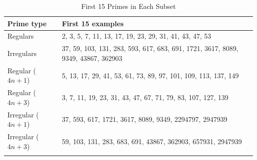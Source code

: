 \begin{longtable}{|l|p{8cm}|}
\hline
\textbf{Prime type} & \textbf{First 15 examples} \\ \hline
Regulars & 2, 3, 5, 7, 11, 13, 17, 19, 23, 29, 31, 41, 43, 47, 53 \\ \hline
Irregulars & 37, 59, 103, 131, 283, 593, 617, 683, 691, 1721, 3617, 8089, 9349, 43867, 362903 \\ \hline
Regular (\( 4n+1 \)) & 5, 13, 17, 29, 41, 53, 61, 73, 89, 97, 101, 109, 113, 137, 149 \\ \hline
Regular (\( 4n+3 \)) & 3, 7, 11, 19, 23, 31, 43, 47, 67, 71, 79, 83, 107, 127, 139 \\ \hline
Irregular (\( 4n+1 \)) & 37, 593, 617, 1721, 3617, 8089, 9349, 2294797, 2947939 \\ \hline
Irregular (\( 4n+3 \)) & 59, 103, 131, 283, 683, 691, 43867, 362903, 657931, 2947939 \\ \hline
\caption{First 15 Primes in Each Subset}
\end{longtable}
\newpage
